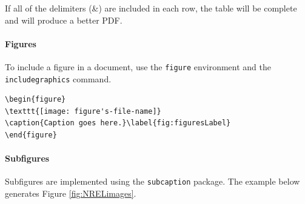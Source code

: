 If all of the delimiters (\&) are included in each row, the table will be complete and will produce a better PDF.

\paragraph{Figures}
To include a figure in a document, use the \texttt{figure} environment and the \texttt{includegraphics} command.

\begin{lstlisting}
\begin{figure}
\texttt{[image: figure's-file-name]}
\caption{Caption goes here.}\label{fig:figuresLabel}
\end{figure}
\end{lstlisting}

\paragraph{Subfigures}

Subfigures are implemented using the \texttt{subcaption} package. The example below generates Figure \ref{fig:NRELimages}.

